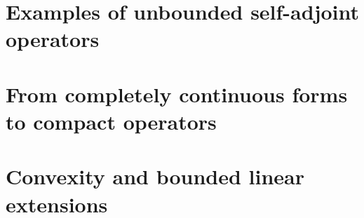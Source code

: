 \documentclass[12pt,b5paper,notitlepage]{article}
\theoremstyle{definition}
\theoremstyle{plain}
\numberwithin{equation}{section}
\begin{document}
\section{Examples of unbounded self-adjoint operators}\label{lb407}









\newpage



\section{From completely continuous forms to compact operators}\label{lb355}


\newpage

\section{Convexity and bounded linear extensions}





\printindex	
\end{document}
